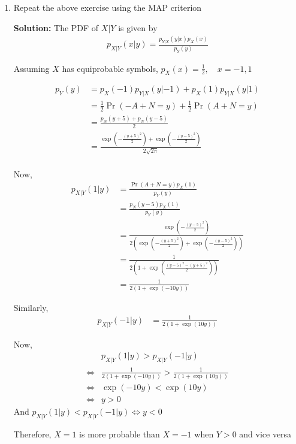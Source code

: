 \documentclass[journal,12pt,twocolumn]{IEEEtran}
\newcommand{\solution}{\noindent \textbf{Solution: }}
\providecommand{\pr}[1]{\ensuremath{\Pr\left(#1\right)}}
\providecommand{\brak}[1]{\ensuremath{\left(#1\right)}}
\numberwithin{equation}{section}
\renewcommand\thesection{\arabic{section}}
\begin{document}
\begin{enumerate}[label=\thesection.\arabic*,ref=\thesection.\theenumi]
	\item Repeat the above exercise using the MAP criterion	
	
	\solution The PDF of $X|Y$ is given by
	\begin{align}
		p_{X|Y}(x|y) = 	\frac{p_{Y|X}(y|x) p_X(x)}{p_Y(y)}
	\end{align}
		 
	Assuming $X$ has equiprobable symbols, $p_X(x) = \frac12, \quad x = -1, 1$
	
	\begin{align}
		p_Y(y) &= p_X(-1) p_{Y|X}(y|-1) + p_X(1) p_{Y|X}(y|1) \\
		&= \frac12 \pr{-A+N=y} + \frac12 \pr{A+N=y} \\
		&= \frac{p_N(y+5) + p_N(y-5)}{2} \\
		&= \frac{\exp\brak{-\frac{(y+5)^2}{2}} + \exp\brak{-\frac{(y-5)^2}{2}}}{2\sqrt{2\pi}} \\
	\end{align}
	
	Now,
	\begin{align}		
		p_{X|Y}(1|y) &= \frac{\pr{A+N=y} p_X(1)}{p_Y(y)} \\
		&= \frac{p_N(y-5) p_X(1)}{p_Y(y)} \\
		&= \frac{\exp\brak{-\frac{(y-5)^2}{2}}}{2\brak{\exp\brak{-\frac{(y+5)^2}{2}} + \exp\brak{-\frac{(y-5)^2}{2}}}} \\
		&= \frac{1}{2\brak{1 + \exp\brak{\frac{(y-5)^2-(y+5)^2}{2}}}} \\
		&= \frac{1}{2\brak{1 + \exp(-10y)}}
	\end{align}
	
	Similarly,
	\begin{align}
		p_{X|Y}(-1|y) &= \frac{1}{2\brak{1 + \exp(10y)}}
	\end{align}
	
	Now,
	\begin{align}
		&p_{X|Y}(1|y) > p_{X|Y}(-1|y) \\
		\iff &\frac{1}{2\brak{1 + \exp(-10y)}} > \frac{1}{2\brak{1 + \exp(10y)}} \\
		\iff &\exp(-10y) < \exp(10y) \\
		\iff &y > 0
	\end{align}
	And $p_{X|Y}(1|y) < p_{X|Y}(-1|y) \iff y < 0$
	
	Therefore, $X=1$ is more probable than $X=-1$ when $Y>0$ and vice versa
	

\end{enumerate}
\end{document}
